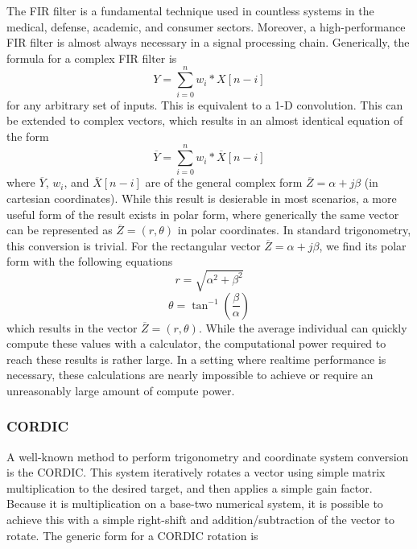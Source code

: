 \documentclass[11pt]{report}
\begin{document}
The FIR filter is a fundamental technique used in countless systems in the medical, defense, academic, and consumer sectors. Moreover, a high-performance FIR filter is almost always necessary in a signal processing chain. Generically, the formula for a complex FIR filter is
\begin{equation}
    Y = \sum_{i=0}^{n}w_i * X[n - i]
\end{equation}
for any arbitrary set of inputs. This is equivalent to a 1-D convolution. This can be extended to complex vectors, which results in an almost identical equation of the form
\begin{equation}
	\overline{Y} = \sum_{i=0}^{n} w_i * \overline{X}[n-i]
\end{equation}
where $\overline{Y}$, $w_i$, and $\overline{X}[n-i]$ are of the general complex form $\overline{Z} = \alpha + j \beta$ (in cartesian coordinates). While this result is desierable in most scenarios, a more useful form of the result exists in polar form, where generically the same vector can be represented as $\overline{Z} = (r, \theta)$ in polar coordinates. In standard trigonometry, this conversion is trivial. For the rectangular vector $\overline{Z} = \alpha + j \beta$, we find its polar form with the following equations
\begin{equation}
	r = \sqrt{\alpha^2 + \beta^2}
\end{equation}
\begin{equation}
	\theta = \tan^{-1}\left({\frac{\beta}{\alpha}}\right)
\end{equation}
which results in the vector $\overline{Z} = (r, \theta)$. While the average individual can quickly compute these values with a calculator, the computational power required to reach these results is rather large. In a setting where realtime performance is necessary, these calculations are nearly impossible to achieve or require an unreasonably large amount of compute power.

\subsubsection{CORDIC}

A well-known method to perform trigonometry and coordinate system conversion is the \ac{CORDIC}. This system iteratively rotates a vector using simple matrix multiplication to the desired target, and then applies a simple gain factor. Because it is multiplication on a base-two numerical system, it is possible to achieve this with a simple right-shift and addition/subtraction of the vector to rotate. The generic form for a CORDIC rotation is
\end{document}
